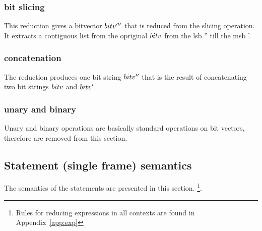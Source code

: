 \documentclass[UTF8]{article}
\begin{document}
\subsubsection*{bit slicing}
This reduction gives a bitvector $bitv'''$ that is reduced from the slicing operation. It extracts a contiguous list from the opriginal $bitv$ from the lsb \bitv'' till the msb \bitv'.

\begin{figure}[ht!]
    \ottusedrule{\ottdruleeXXsliceXXv{}}
\end{figure}




\subsubsection*{concatenation}
The reduction produces one bit string $bitv''$ that is the result of concatenating two bit strings $bitv$ and $bitv'$.

\begin{figure}[ht!]
    \ottusedrule{\ottdruleeXXconcatXXv{}}
\end{figure}




\subsubsection*{unary and binary}
Unary and binary operations are basically standard operations on bit vectors, therefore are removed from this section.  



\subsection{Statement (single frame) semantics}
The semantics of the statements are presented in this section. \footnote{Rules for reducing expressions in all contexts are found in Appendix~\ref{app:exp}}.


\end{document}

